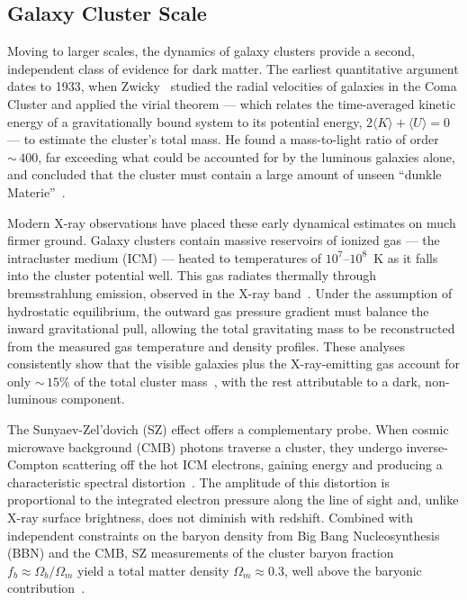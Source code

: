 \subsection{Galaxy Cluster Scale}
\label{sec:1.1.2}

Moving to larger scales, the dynamics of galaxy clusters provide a second, independent class of evidence for dark matter.
The earliest quantitative argument dates to 1933, when Zwicky~\cite{Cirelli:2024ssz} studied the radial velocities of galaxies in the Coma Cluster and applied the virial theorem --- which relates the time-averaged kinetic energy of a gravitationally bound system to its potential energy, $2\langle K \rangle + \langle U \rangle = 0$ --- to estimate the cluster's total mass.
He found a mass-to-light ratio of order ${\sim}\,400$, far exceeding what could be accounted for by the luminous galaxies alone, and concluded that the cluster must contain a large amount of unseen ``dunkle Materie''~\cite{Cirelli:2024ssz}.

Modern X-ray observations have placed these early dynamical estimates on much firmer ground.
Galaxy clusters contain massive reservoirs of ionized gas --- the intracluster medium (ICM) --- heated to temperatures of $10^7$--$10^8$~K as it falls into the cluster potential well.
This gas radiates thermally through bremsstrahlung emission, observed in the X-ray band~\cite{Cirelli:2024ssz}.
Under the assumption of hydrostatic equilibrium, the outward gas pressure gradient must balance the inward gravitational pull, allowing the total gravitating mass to be reconstructed from the measured gas temperature and density profiles.
These analyses consistently show that the visible galaxies plus the X-ray-emitting gas account for only ${\sim}\,15\%$ of the total cluster mass~\cite{Cirelli:2024ssz}, with the rest attributable to a dark, non-luminous component.

The Sunyaev-Zel'dovich (SZ) effect offers a complementary probe.
When cosmic microwave background (CMB) photons traverse a cluster, they undergo inverse-Compton scattering off the hot ICM electrons, gaining energy and producing a characteristic spectral distortion~\cite{Cirelli:2024ssz,Bullock:2017xww}.
The amplitude of this distortion is proportional to the integrated electron pressure along the line of sight and, unlike X-ray surface brightness, does not diminish with redshift.
Combined with independent constraints on the baryon density from Big Bang Nucleosynthesis (BBN) and the CMB, SZ measurements of the cluster baryon fraction $f_b \approx \Omega_b / \Omega_m$ yield a total matter density $\Omega_m \approx 0.3$, well above the baryonic contribution~\cite{Cirelli:2024ssz}.

